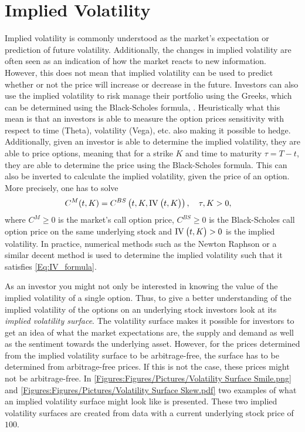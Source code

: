 \section{Implied Volatility}\label{Sec.Implied_Volatility}
Implied volatility is commonly understood as the market's expectation or prediction of future volatility. Additionally, the changes in implied volatility are often seen as an indication of how the market reacts to new information. However, this does not mean that implied volatility can be used to predict whether or not the price will increase or decrease in the future. Investors can also use the implied volatility to risk manage their portfolio using the Greeks, which can be determined using the Black-Scholes formula, \citep{BS}. Heuristically what this mean is that an investors is able to measure the option prices sensitivity with respect to time (Theta), volatility (Vega), etc. also making it possible to hedge. Additionally, given an investor is able to determine the implied volatility, they are able to price options, meaning that for a strike $K$ and time to maturity $\tau=T-t$, they are able to determine the price using the Black-Scholes formula. This can also be inverted to calculate the implied volatility, given the price of an option. More precisely, one has to solve
\begin{align}\label{Eq:IV_formula}
    C^{M}(t,K) &= C^{BS}\left(t,K,\IV{t,K}\right),\quad \tau,K>0,
\end{align}
where $C^{M}\geq0$ is the market's call option price, $C^{BS}\geq0$ is the Black-Scholes call option price on the same underlying stock and $\IV{t,K}>0$ is the implied volatility. In practice, numerical methods such as the Newton Raphson or a similar decent method is used to determine the implied volatility such that it satisfies \eqref{Eq:IV_formula}.

As an investor you might not only be interested in knowing the value of the implied volatility of a single option. Thus, to give a better understanding of the implied volatility of the options on an underlying stock investors look at its \emph{implied volatility surface}. The volatility surface makes it possible for investors to get an idea of what the market expectations are, the supply and demand as well as the sentiment towards the underlying asset. However, for the prices determined from the implied volatility surface to be arbitrage-free, the surface has to be determined from arbitrage-free prices. If this is not the case, these prices might not be arbitrage-free. In \autoref{Figures:Figures/Pictures/Volatility Surface Smile.png} and \autoref{Figures:Figures/Pictures/Volatility Surface Skew.pdf} two examples of what an implied volatility surface might look like is presented. These two implied volatility surfaces are created from data with a current underlying stock price of $100$.

